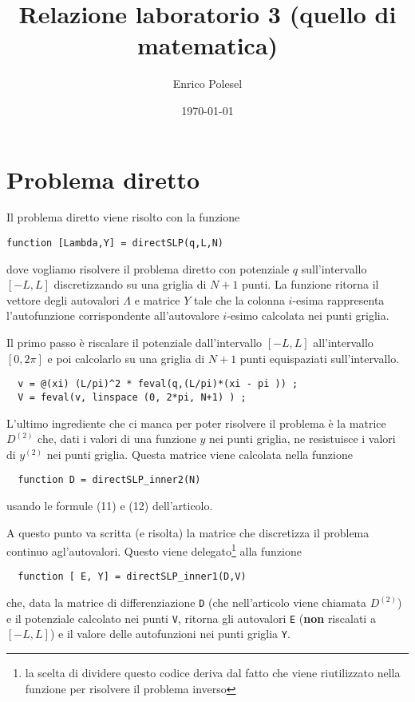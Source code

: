 \documentclass[a4paper,10pt]{article}
\title{Relazione laboratorio 3 (quello di matematica)}
\author{Enrico Polesel}
\date{\today}
\theoremstyle{plain}
\theoremstyle{definition}
\theoremstyle{remark}
\begin{document}
\maketitle

\lstset{language=Matlab,frame=single}

\section{Problema diretto}

Il problema diretto viene risolto con la funzione
\begin{lstlisting}
function [Lambda,Y] = directSLP(q,L,N)
\end{lstlisting}
dove vogliamo risolvere il problema diretto con potenziale $q$
sull'intervallo $[-L,L]$ discretizzando su una griglia di $N+1$
punti. La funzione ritorna il vettore degli autovalori $\Lambda$ e
matrice $Y$ tale che la colonna $i$-esima rappresenta l'autofunzione
corrispondente all'autovalore $i$-esimo calcolata nei punti griglia. 

Il primo passo è riscalare il potenziale dall'intervallo $[-L,L]$
all'intervallo $[0,2\pi ]$ e poi calcolarlo su una griglia di $N+1$
punti equispaziati sull'intervallo.
\begin{lstlisting}
  v = @(xi) (L/pi)^2 * feval(q,(L/pi)*(xi - pi )) ;
  V = feval(v, linspace (0, 2*pi, N+1) ) ;
\end{lstlisting}

L'ultimo ingrediente che ci manca per poter risolvere il problema è la
matrice $D^{(2)}$ che, dati i valori di una funzione $y$ nei punti
griglia, ne resistuisce i valori di $y^{(2)}$ nei punti
griglia. Questa matrice viene calcolata nella funzione
\begin{lstlisting}
  function D = directSLP_inner2(N)
\end{lstlisting}
usando le formule (11) e (12) dell'articolo.

A questo punto va scritta (e risolta) la matrice che discretizza il
problema continuo agl'autovalori. Questo viene delegato\footnote{la
  scelta di dividere questo codice deriva dal fatto che viene
  riutilizzato nella funzione per risolvere il problema inverso} alla
funzione
\begin{lstlisting}
  function [ E, Y] = directSLP_inner1(D,V)
\end{lstlisting}
che, data la matrice di differenziazione \lstinline{D} (che
nell'articolo viene chiamata $D^{(2)}$) e il potenziale calcolato nei
punti \lstinline{V}, ritorna gli autovalori \lstinline{E} (\textbf{non}
riscalati a $[-L,L]$) e il valore delle autofunzioni nei punti griglia
\lstinline{Y}.
\end{document}
